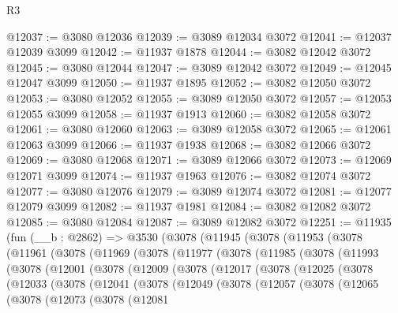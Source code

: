 \begin{lexlean}{R3}
\begin{coremodule}
@12037 := @3080 @12036
@12039 := @3089 @12034 @3072
@12041 := @12037 @12039 @3099
@12042 := @11937 @1878
@12044 := @3082 @12042 @3072
@12045 := @3080 @12044
@12047 := @3089 @12042 @3072
@12049 := @12045 @12047 @3099
@12050 := @11937 @1895
@12052 := @3082 @12050 @3072
@12053 := @3080 @12052
@12055 := @3089 @12050 @3072
@12057 := @12053 @12055 @3099
@12058 := @11937 @1913
@12060 := @3082 @12058 @3072
@12061 := @3080 @12060
@12063 := @3089 @12058 @3072
@12065 := @12061 @12063 @3099
@12066 := @11937 @1938
@12068 := @3082 @12066 @3072
@12069 := @3080 @12068
@12071 := @3089 @12066 @3072
@12073 := @12069 @12071 @3099
@12074 := @11937 @1963
@12076 := @3082 @12074 @3072
@12077 := @3080 @12076
@12079 := @3089 @12074 @3072
@12081 := @12077 @12079 @3099
@12082 := @11937 @1981
@12084 := @3082 @12082 @3072
@12085 := @3080 @12084
@12087 := @3089 @12082 @3072
@12251 := @11935
    (fun (__b : @2862) =>
    @3530
      (@3078
        (@11945
          (@3078
            (@11953
              (@3078
                (@11961
                  (@3078
                    (@11969
                      (@3078
                        (@11977
                          (@3078
                            (@11985
                              (@3078
                                (@11993
                                  (@3078
                                    (@12001
                                      (@3078
                                        (@12009
                                          (@3078
                                            (@12017
                                              (@3078
                                                (@12025
                                                  (@3078
                                                    (@12033
                                                      (@3078
                                                        (@12041
                                                          (@3078
                                                            (@12049
                                                              (@3078
                                                                (@12057
                                                                  (@3078
                                                                    (@12065
                                                                      (@3078
                                                                        (@12073
                                                                          (@3078
                                                                            (@12081

\end{coremodule}
\end{lexlean}
